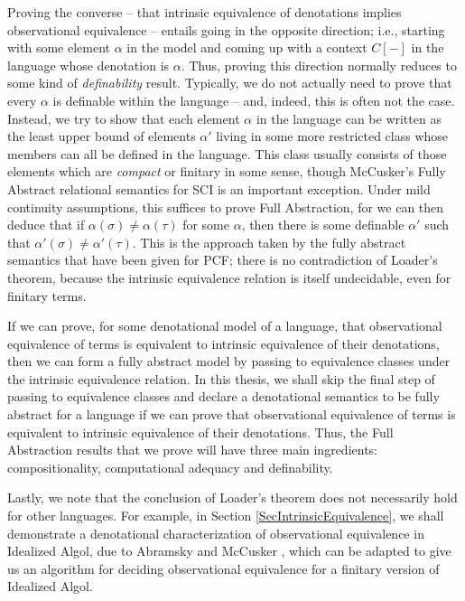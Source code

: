 Proving the converse -- that intrinsic equivalence of denotations implies observational equivalence -- entails going in the opposite direction; i.e., starting with some element $\alpha$ in the model and coming up with a context $C[-]$ in the language whose denotation is $\alpha$.  
Thus, proving this direction normally reduces to some kind of \emph{definability} result.  
Typically, we do not actually need to prove that every $\alpha$ is definable within the language -- and, indeed, this is often not the case.  
Instead, we try to show that each element $\alpha$ in the language can be written as the least upper bound of elements $\alpha'$ living in some more restricted class whose members can all be defined in the language.  
This class usually consists of those elements which are \emph{compact} or finitary in some sense, though McCusker's Fully Abstract relational semantics for SCI \cite{GuySci} is an important exception.
Under mild continuity assumptions, this suffices to prove Full Abstraction, for we can then deduce that if $\alpha(\sigma)\ne \alpha(\tau)$ for some $\alpha$, then there is some definable $\alpha'$ such that $\alpha'(\sigma)\ne\alpha'(\tau)$.
This is the approach taken by the fully abstract semantics that have been given for PCF; there is no contradiction of Loader's theorem, because the intrinsic equivalence relation is itself undecidable, even for finitary terms.

If we can prove, for some denotational model of a language, that observational equivalence of terms is equivalent to intrinsic equivalence of their denotations, then we can form a fully abstract model by passing to equivalence classes under the intrinsic equivalence relation.  
In this thesis, we shall skip the final step of passing to equivalence classes and declare a denotational semantics to be fully abstract for a language if we can prove that observational equivalence of terms is equivalent to intrinsic equivalence of their denotations.  
Thus, the Full Abstraction results that we prove will have three main ingredients: compositionality, computational adequacy and definability.

Lastly, we note that the conclusion of Loader's theorem does not necessarily hold for other languages.  
For example, in Section \ref{SecIntrinsicEquivalence}, we shall demonstrate a denotational characterization of observational equivalence in Idealized Algol, due to Abramsky and McCusker \cite{SamsonGuyIAActive}, which can be adapted to give us an algorithm for deciding observational equivalence for a finitary version of Idealized Algol.


